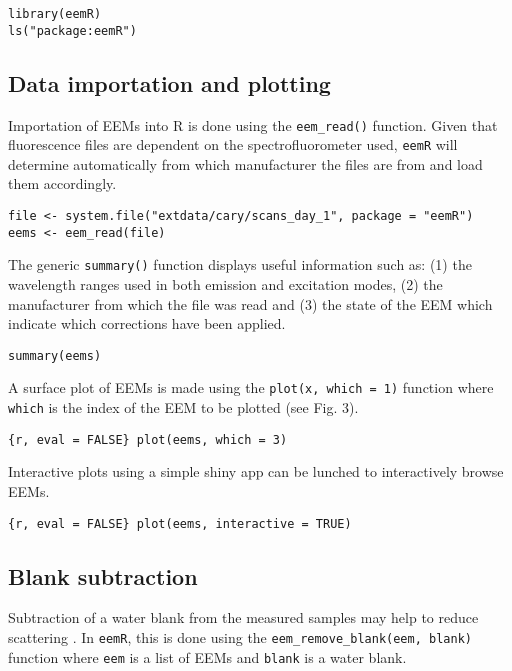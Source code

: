\documentclass[]{book}
\theoremstyle{definition}
\theoremstyle{definition}
\theoremstyle{remark}
\begin{document}
\begin{verbatim}
library(eemR)
ls("package:eemR")
\end{verbatim}

\subsection{Data importation and
plotting}\label{data-importation-and-plotting}

Importation of EEMs into R is done using the \texttt{eem\_read()}
function. Given that fluorescence files are dependent on the
spectrofluorometer used, \texttt{eemR} will determine automatically from
which manufacturer the files are from and load them accordingly.

\begin{verbatim}
file <- system.file("extdata/cary/scans_day_1", package = "eemR")
eems <- eem_read(file)
\end{verbatim}

The generic \texttt{summary()} function displays useful information such
as: (1) the wavelength ranges used in both emission and excitation
modes, (2) the manufacturer from which the file was read and (3) the
state of the EEM which indicate which corrections have been applied.

\begin{verbatim}
summary(eems)
\end{verbatim}

A surface plot of EEMs is made using the \texttt{plot(x,\ which\ =\ 1)}
function where \texttt{which} is the index of the EEM to be plotted (see
Fig. 3).

\texttt{\{r,\ eval\ =\ FALSE\}\ plot(eems,\ which\ =\ 3)}

Interactive plots using a simple shiny app can be lunched to
interactively browse EEMs.

\texttt{\{r,\ eval\ =\ FALSE\}\ plot(eems,\ interactive\ =\ TRUE)}

\subsection{Blank subtraction}\label{blank-subtraction}

Subtraction of a water blank from the measured samples may help to
reduce scattering \citep{Murphy2013, Stedmon2008}. In \texttt{eemR},
this is done using the \texttt{eem\_remove\_blank(eem,\ blank)} function
where \texttt{eem} is a list of EEMs and \texttt{blank} is a water
blank.
\end{document}
